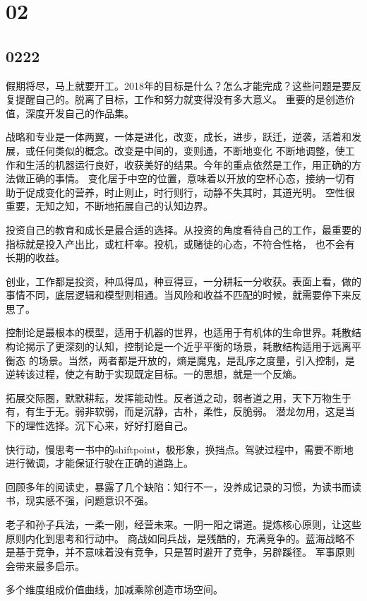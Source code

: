 \section{02}

\subsection{0222}

假期将尽，马上就要开工。2018年的目标是什么？怎么才能完成？这些问题是要反复提醒自己的。脱离了目标，工作和努力就变得没有多大意义。
重要的是创造价值，深度开发自己的作品集。

战略和专业是一体两翼，一体是进化，改变，成长，进步，跃迁，逆袭，活着和发展，或任何类似的概念。改变是中间的，变则通，不断地变化
不断地调整，使工作和生活的机器运行良好，收获美好的结果。今年的重点依然是工作，用正确的方法做正确的事情。
变化居于中空的位置，意味着以开放的空杯心态，接纳一切有助于促成变化的营养，时止则止，时行则行，动静不失其时，其道光明。
空性很重要，无知之知，不断地拓展自己的认知边界。

投资自己的教育和成长是最合适的选择。从投资的角度看待自己的工作，最重要的指标就是投入产出比，或杠杆率。投机，或赌徒的心态，不符合性格，
也不会有长期的收益。

创业，工作都是投资，种瓜得瓜，种豆得豆，一分耕耘一分收获。表面上看，做的事情不同，底层逻辑和模型则相通。当风险和收益不匹配的时候，就需要停下来反思了。

控制论是最根本的模型，适用于机器的世界，也适用于有机体的生命世界。耗散结构论揭示了更深刻的认知，控制论是一个近乎平衡的场景，耗散结构适用于远离平衡态
的场景。当然，两者都是开放的，熵是魔鬼，是乱序之度量，引入控制，是逆转该过程，使之有助于实现既定目标。一的思想，就是一个反熵。

拓展交际圈，默默耕耘，发挥能动性。反者道之动，弱者道之用，天下万物生于有，有生于无。弱非软弱，而是沉静，古朴，柔性，反脆弱。
潜龙勿用，这是当下的理性选择。沉下心来，好好打磨自己。


快行动，慢思考一书中的shiftpoint，极形象，换挡点。驾驶过程中，需要不断地进行微调，才能保证行驶在正确的道路上。

回顾多年的阅读史，暴露了几个缺陷：知行不一，没养成记录的习惯，为读书而读书，现实感不强，问题意识不强。

老子和孙子兵法，一柔一刚，经营未来。一阴一阳之谓道。提炼核心原则，让这些原则内化到思考和行动中。
商战如同兵战，是残酷的，充满竞争的。蓝海战略不是基于竞争，并不意味着没有竞争，只是暂时避开了竞争，另辟蹊径。
军事原则会带来最多启示。

多个维度组成价值曲线，加减乘除创造市场空间。
